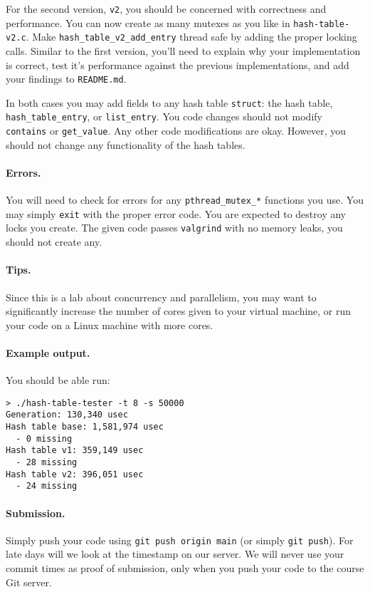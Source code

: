 For the second version, \texttt{v2}, you should be concerned with correctness
and performance.
You can now create as many mutexes as you like in \texttt{hash-table-v2.c}.
Make \texttt{hash\_table\_v2\_add\_entry} thread safe by adding the proper
locking calls.
Similar to the first version, you'll need to explain why your implementation
is correct, test it's performance against the previous implementations, and
add your findings to \texttt{README.md}.

In both cases you may add fields to any hash table \texttt{struct}: the hash
table, \texttt{hash\_table\_entry}, or \texttt{list\_entry}. You code changes
should not modify \texttt{contains} or \texttt{get\_value}. Any other code
modifications are okay. However, you should not change any functionality of the
hash tables.

\paragraph{Errors.}

You will need to check for errors for any \texttt{pthread\_mutex\_*} functions
you use.
You may simply \texttt{exit} with the proper error code.
You are expected to destroy any locks you create.
The given code passes \texttt{valgrind} with no memory leaks, you should not
create any.

\paragraph{Tips.}

Since this is a lab about concurrency and parallelism, you may want to
significantly increase the number of cores given to your virtual machine, or
run your code on a Linux machine with more cores.

\paragraph{Example output.}

You should be able run:

\begin{lstlisting}
> ./hash-table-tester -t 8 -s 50000
Generation: 130,340 usec
Hash table base: 1,581,974 usec
  - 0 missing
Hash table v1: 359,149 usec
  - 28 missing
Hash table v2: 396,051 usec
  - 24 missing
\end{lstlisting}

\paragraph{Submission.}

Simply push your code using \lstinline|git push origin main| (or simply
\lstinline|git push|).
For late days will we look at the timestamp on our server.
We will never use your commit times as proof of submission, only when you
push your code to the course Git server.


